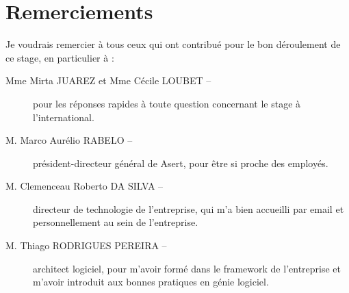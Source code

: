\chapter*{Remerciements}

Je voudrais remercier à tous ceux qui ont contribué pour le bon déroulement de ce stage, en particulier à :

\vspace{1em}

\begin{description}
\item[Mme Mirta JUAREZ et Mme Cécile LOUBET --] pour les réponses rapides à toute question concernant le stage à l'international.
\item[M. Marco Aurélio RABELO --] président-directeur général de Asert, pour être si proche des employés.
\item[M. Clemenceau Roberto DA SILVA --] directeur de technologie de l'entreprise, qui m'a bien accueilli par email et personnellement au sein de l'entreprise.
\item[M. Thiago RODRIGUES PEREIRA --] architect logiciel, pour m'avoir formé dans le framework de l'entreprise et m'avoir introduit aux bonnes pratiques en génie logiciel.
\end{description}

